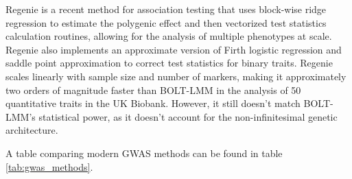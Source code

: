 Regenie \cite{mbatchou2021computationally} is a recent method for association testing that uses block-wise ridge regression to estimate the polygenic effect and then vectorized test statistics calculation routines, allowing for the analysis of multiple phenotypes at scale. Regenie also implements an approximate version of Firth logistic regression and saddle point approximation to correct test statistics for binary traits. Regenie scales linearly with sample size and number of markers, making it approximately two orders of magnitude faster than BOLT-LMM in the analysis of 50 quantitative traits in the UK Biobank. However, it still doesn't match BOLT-LMM's statistical power, as it doesn't account for the non-infinitesimal genetic architecture.

A table comparing modern GWAS methods can be found in table \ref{tab:gwas_methods}. 


